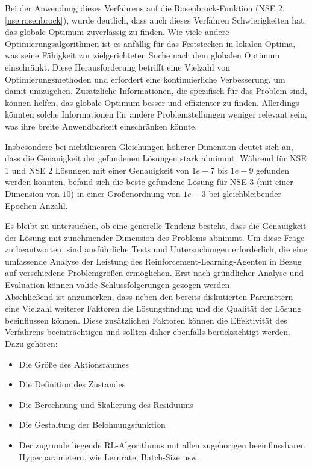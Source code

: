 \documentclass{article}
\theoremstyle{newline}
\begin{document}
\begin{onehalfspace}
Bei der Anwendung dieses Verfahrens auf die Rosenbrock-Funktion (NSE 2, \ref{nse:rosenbrock}), wurde deutlich, dass auch dieses Verfahren Schwierigkeiten hat, das globale Optimum zuverlässig zu finden. Wie viele andere Optimierungsalgorithmen ist es anfällig für das Feststecken in lokalen Optima, was seine Fähigkeit zur zielgerichteten Suche nach dem globalen Optimum einschränkt. Diese Herausforderung betrifft eine Vielzahl von Optimierungsmethoden und erfordert eine kontinuierliche Verbesserung, um damit umzugehen. Zusätzliche Informationen, die spezifisch für das Problem sind, können helfen, das globale Optimum besser und effizienter zu finden. Allerdings könnten solche Informationen für andere Problemstellungen weniger relevant sein, was ihre breite Anwendbarkeit einschränken könnte.
\medskip

Insbesondere bei nichtlinearen Gleichungen höherer Dimension deutet sich an, dass die Genauigkeit der gefundenen Lösungen stark abnimmt. Während für NSE 1 und NSE 2 Lösungen mit einer Genauigkeit von $1e-7$ bis $1e-9$ gefunden werden konnten, befand sich die beste gefundene Lösung für NSE 3 (mit einer Dimension von  $10$) in einer Größenordnung von $1e-3$ bei gleichbleibender Epochen-Anzahl.

Es bleibt zu untersuchen, ob eine generelle Tendenz besteht, dass die Genauigkeit der Lösung mit zunehmender Dimension des Problems abnimmt. Um diese Frage zu beantworten, sind ausführliche Tests und Untersuchungen erforderlich, die eine umfassende Analyse der Leistung des Reinforcement-Learning-Agenten in Bezug auf verschiedene Problemgrößen ermöglichen. Erst nach gründlicher Analyse und Evaluation können valide Schlussfolgerungen gezogen werden.
\\

Abschließend ist anzumerken, dass neben den bereits diskutierten Parametern eine Vielzahl weiterer Faktoren die Lösungsfindung und die Qualität der Lösung beeinflussen können. Diese zusätzlichen Faktoren können die Effektivität des Verfahrens beeinträchtigen und sollten daher ebenfalls berücksichtigt werden. Dazu gehören:

\begin{itemize}
	\item Die Größe des Aktionsraumes
	\item Die Definition des Zustandes
	\item Die Berechnung und Skalierung des Residuums
	\item Die Gestaltung der Belohnungsfunktion
	\item Der zugrunde liegende RL-Algorithmus mit allen zugehörigen beeinflussbaren Hyperparametern, wie Lernrate, Batch-Size usw.
\end{itemize}


\end{onehalfspace}
\end{document}
